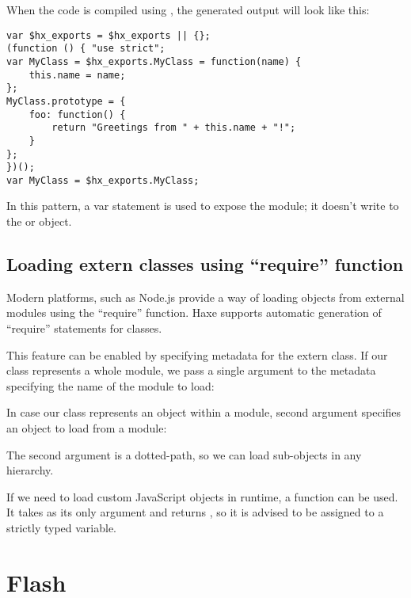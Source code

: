 When the code is compiled using , the generated output will look like this:

\begin{lstlisting}
var $hx_exports = $hx_exports || {};
(function () { "use strict";
var MyClass = $hx_exports.MyClass = function(name) {
	this.name = name;
};
MyClass.prototype = {
	foo: function() {
		return "Greetings from " + this.name + "!";
	}
};
})();
var MyClass = $hx_exports.MyClass;
\end{lstlisting}

In this pattern, a var statement is used to expose the module; it doesn't write to the  or  object. 

\subsection{Loading extern classes using ``require'' function}
\label{target-javascript-require}

Modern  platforms, such as Node.js provide a way of loading objects
from external modules using the ``require'' function. Haxe supports automatic generation
of ``require'' statements for  classes.

This feature can be enabled by specifying  metadata for the extern class. If our  class represents a whole module, we pass a single argument to the  metadata specifying the name of the module to load:


In case our  class represents an object within a module, second  argument specifies an object to load from a module:


The second argument is a dotted-path, so we can load sub-objects in any hierarchy.

If we need to load custom JavaScript objects in runtime, a  function can be used. It takes  as its only argument and returns , so it is advised to be assigned to a strictly typed variable.

\section{Flash}
\label{target-flash}

